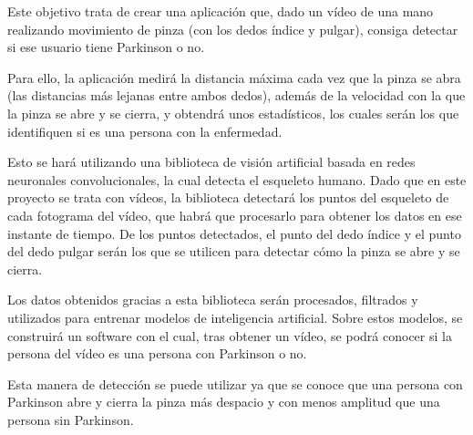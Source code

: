 Este objetivo trata de crear una aplicación que, dado un vídeo de una mano realizando movimiento de pinza (con los dedos índice y pulgar), consiga detectar si ese usuario tiene Parkinson o no.

Para ello, la aplicación medirá la distancia máxima cada vez que la pinza se abra (las distancias más lejanas entre ambos dedos), además de la velocidad con la que la pinza se abre y se cierra, y obtendrá unos estadísticos, los cuales serán los que identifiquen si es una persona con la enfermedad.

Esto se hará utilizando una biblioteca de visión artificial basada en redes neuronales convolucionales, la cual detecta el esqueleto humano. Dado que en este proyecto se trata con vídeos, la biblioteca detectará los puntos del esqueleto de cada fotograma del vídeo, que habrá que procesarlo para
obtener los datos en ese instante de tiempo. De los puntos detectados, el punto del dedo índice y el punto del dedo pulgar serán los que se utilicen para detectar cómo la pinza se abre y se cierra.

Los datos obtenidos gracias a esta biblioteca serán procesados, filtrados y utilizados para entrenar modelos de inteligencia artificial. Sobre estos modelos, se construirá un software con el cual, tras obtener un vídeo, se podrá conocer si la persona del vídeo es una persona con Parkinson o no.

Esta manera de detección se puede utilizar ya que se conoce que una persona con Parkinson abre y cierra la pinza más despacio y con menos amplitud que una persona sin Parkinson.
